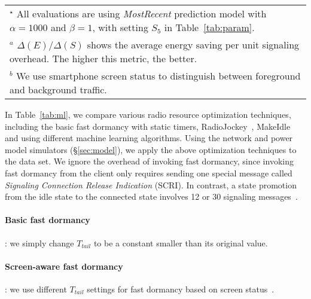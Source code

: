 \begin{table*}[t]
\begin{center}
\begin{tabular}{|c|c|c|c|c|c|c|}
\hline
\end{tabular}
\begin{tabular}{l}
\\{$^\star$} All evaluations are using {\em MostRecent} prediction model with $\alpha=1000$ and $\beta=1$, with setting $S_{5}$ in Table~\ref{tab:param}.
\\{$^a$} $\Delta(E)/\Delta(S)$ shows the average energy saving per unit signaling overhead. The higher this metric, the better.
\\{$^b$} We use smartphone screen status to distinguish between foreground and background traffic.
\end{tabular}
\label{tab:ml}
\end{center}
\end{table*}


In Table~\ref{tab:ml}, we compare various radio resource optimization techniques, including the basic fast dormancy with static timers, RadioJockey~\cite{radiojockey}, MakeIdle~\cite{makeidle} and \NAME using different machine learning algorithms. Using the network and power model simulators (\S\ref{sec:model}), we apply the above optimization techniques to the \UMICH data set. We ignore the overhead of invoking fast dormancy, since invoking fast dormancy from the client only requires sending one special message called {\em Signaling Connection Release Indication} (SCRI). In contrast, a state promotion from the idle state to the connected state involves 12 or 30 signaling messages~\cite{radiojockey}.

\paragraph{Basic fast dormancy}: we simply change $T_{tail}$ to be a constant smaller than its original value.

\paragraph{Screen-aware fast dormancy}: we use different $T_{tail}$ settings for fast dormancy based on screen status~\cite{imc.screen}.


